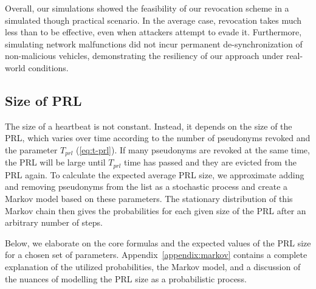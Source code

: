 Overall, our simulations showed the feasibility of our revocation scheme in a
simulated though practical scenario. In the average case, revocation takes much
less than \paramteff{} to be effective, even when attackers attempt to evade it.
Furthermore, simulating network malfunctions did not incur permanent
de-synchronization of non-malicious vehicles, demonstrating the resiliency
of our approach under real-world conditions.
 
\subsection{Size of PRL}
\label{section:eval-prl-size}

The size of a heartbeat is not constant.  Instead, it depends on the size of the
\ac{PRL}, which varies over time according to the number of pseudonyms revoked
and the parameter $T_{prl}$ (\cref{eq:t-prl}). If many pseudonyms are revoked at
the same time, the \ac{PRL} will be large until $T_{prl}$ time has passed and
they are evicted from the \ac{PRL} again. To calculate the expected average
\ac{PRL} size, we approximate adding and removing pseudonyms from the list as a
stochastic process and create a Markov model based on these parameters. The
stationary distribution of this Markov chain then gives the probabilities for
each given size of the \ac{PRL} after an arbitrary number of steps.

Below, we elaborate on the core formulas and the expected values of the \ac{PRL}
size for a chosen set of parameters. Appendix~\ref{appendix:markov} contains a
complete explanation of the utilized probabilities, the Markov model, and a
discussion of the nuances of modelling the \ac{PRL} size as a probabilistic
process.


